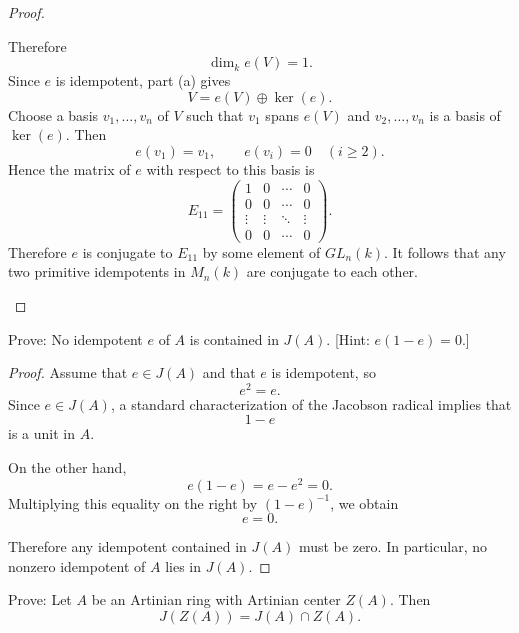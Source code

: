 \begin{proof}
\begin{enumerate}
              Therefore
              \[
                  \dim_k e(V)=1.
              \]
              Since \(e\) is idempotent, part (a) gives
              \[
                  V=e(V)\oplus \ker(e).
              \]
              Choose a basis \(v_1,\dots,v_n\) of \(V\) such that \(v_1\) spans \(e(V)\) and
              \(v_2,\dots,v_n\) is a basis of \(\ker(e)\). Then
              \[
                  e(v_1)=v_1,
                  \qquad
                  e(v_i)=0 \quad (i\ge 2).
              \]
              Hence the matrix of \(e\) with respect to this basis is
              \[
                  E_{11}=
                  \begin{pmatrix}
                      1      & 0      & \cdots & 0      \\
                      0      & 0      & \cdots & 0      \\
                      \vdots & \vdots & \ddots & \vdots \\
                      0      & 0      & \cdots & 0
                  \end{pmatrix}.
              \]
              Therefore \(e\) is conjugate to \(E_{11}\) by some element of \(GL_n(k)\). It follows that
              any two primitive idempotents in \(M_n(k)\) are conjugate to each other.
    \end{enumerate}
\end{proof}

\begin{exercise}
    Prove: No idempotent \(e\) of \(A\) is contained in \(J(A)\). [Hint: \(e(1-e)=0\).]
\end{exercise}

\begin{proof}
    Assume that \(e\in J(A)\) and that \(e\) is idempotent, so
    \[
        e^2=e.
    \]
    Since \(e\in J(A)\), a standard characterization of the Jacobson radical implies that
    \[
        1-e
    \]
    is a unit in \(A\).

    On the other hand,
    \[
        e(1-e)=e-e^2=0.
    \]
    Multiplying this equality on the right by \((1-e)^{-1}\), we obtain
    \[
        e=0.
    \]

    Therefore any idempotent contained in \(J(A)\) must be zero. In particular, no nonzero idempotent of \(A\) lies in \(J(A)\).
\end{proof}

\begin{exercise}
    Prove: Let \(A\) be an Artinian ring with Artinian center \(Z(A)\). Then
    \[
        J(Z(A)) = J(A) \cap Z(A).
    \]
\end{exercise}

